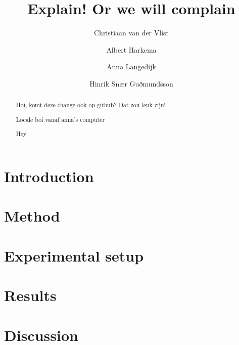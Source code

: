 \documentclass[sigconf,authordraft]{acmart}
\begin{document}
\title{Explain! Or we will complain}
\author{Christiaan van der Vlist}

\author{Albert Harkema}

\author{Anna Langedijk}

\author{Hinrik Snær Guðmundsson}
\renewcommand{\shortauthors}{van der Vlist, et al.}

\begin{abstract}
Hoi, komt deze change ook op github? Dat zou leuk zijn!

Locale boi vanaf anna's computer

Hey \cite{Spector90}
\end{abstract}


\maketitle

\section{Introduction}


\section{Method}


\section{Experimental setup}


\section{Results}


\section{Discussion}

\end{document}
